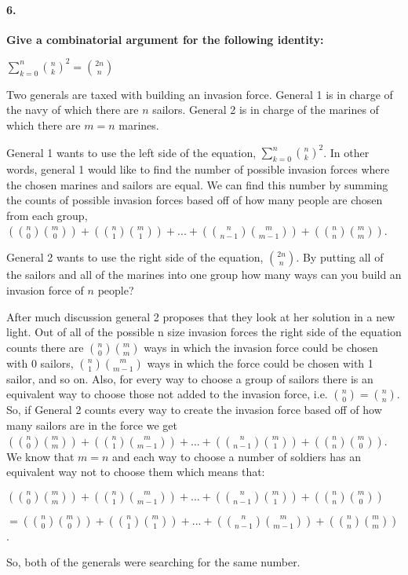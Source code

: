 \documentclass{article}
\begin{document}
\pagebreak

\paragraph{6. }
\textbf{Give a combinatorial argument for the following identity:}
\begin{center}
$\sum\limits_{k=0}^n {n \choose k}^2 = {2n \choose n}$
\end{center}

Two generals are taxed with building an invasion force. General 1 is in charge 
of the navy of which there are $n$ sailors. General 2 is in charge of the 
marines of which there are ${m = n}$ marines. 

General 1 wants to use the left side of the equation, ${\sum\limits_{k=0}^n 
{n \choose k}^2}$. In other words, general 1 would like to find the number of 
possible invasion forces where the chosen marines and sailors are equal. We can 
find this number by summing the counts of possible invasion forces based off of 
how many people are chosen from each group, ${ ({n \choose 0} {m \choose 0}) + 
({n \choose 1} {m \choose 1}) + ... + ({n \choose n-1} {m \choose m-1}) + 
({n \choose n} {m \choose m})}$.

General 2 wants to use the right side of the equation, ${2n \choose n}$. By 
putting all of the sailors and all of the marines into one group how many ways 
can you build an invasion force of $n$ people?

After much discussion general 2 proposes that they look at her solution in a new 
light. Out of all of the possible n size invasion forces the right side of the 
equation counts there are ${ {n \choose 0} {m \choose m}}$ ways in which the 
invasion force could be chosen with 0 sailors, ${ {n \choose 1} 
{m \choose m-1}}$ ways in which the force could be chosen with 1 sailor, and so 
on. Also, for every way to choose a group of sailors there is an equivalent way 
to choose those not added to the invasion force, i.e. ${ {n \choose 0} = 
{n \choose n}}$. So, if General 2 counts every way to create the 
invasion force based off of how many sailors are in the force we get 
${ ({n \choose 0} {m \choose m}) + ({n \choose 1} {m \choose m-1}) + ... + 
({n \choose n-1} {m \choose 1}) + ({n \choose n} {m \choose 0})}$. We know that 
${m = n}$ and each way to choose a number of soldiers has an equivalent way not 
to choose them which means that: 

${ ({n \choose 0} {m \choose m}) + ({n \choose 1} {m \choose m-1}) + ... + 
({n \choose n-1} {m \choose 1}) + ({n \choose n} {m \choose 0})}$ 

${= ({n \choose 0} {m \choose 0}) + ({n \choose 1} {m \choose 1}) + ... + 
({n \choose n-1} {m \choose m-1}) + ({n \choose n} {m \choose m})}$. 

So, both of the generals were searching for the same number.
\end{document}
